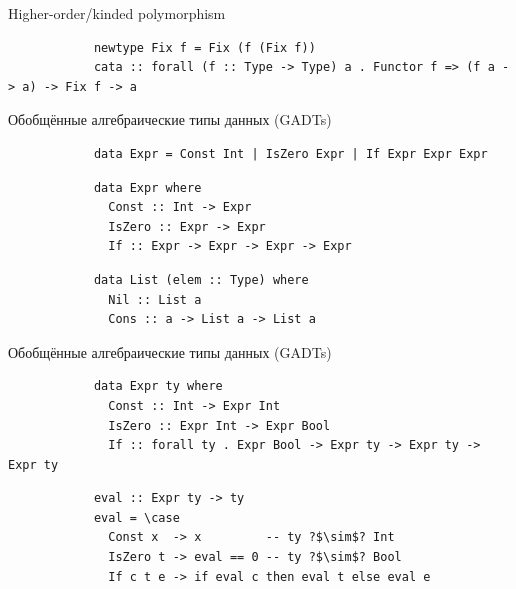     \begin{frame}[fragile]{Higher-order/kinded polymorphism}
        \pause
        \begin{verbatim}
            newtype Fix f = Fix (f (Fix f))
            cata :: forall (f :: Type -> Type) a . Functor f => (f a -> a) -> Fix f -> a
        \end{verbatim}
    \end{frame}

    \begin{frame}[fragile]{Обобщённые алгебраические типы данных (GADTs)}
        \pause
        \begin{verbatim}
            data Expr = Const Int | IsZero Expr | If Expr Expr Expr
        \end{verbatim}

        \pause\hspace{2em}
        \begin{verbatim}
            data Expr where
              Const :: Int -> Expr
              IsZero :: Expr -> Expr
              If :: Expr -> Expr -> Expr -> Expr
        \end{verbatim}

        \pause\hspace{2em}
        \begin{verbatim}
            data List (elem :: Type) where
              Nil :: List a
              Cons :: a -> List a -> List a
        \end{verbatim}
    \end{frame}

    \begin{frame}[fragile]{Обобщённые алгебраические типы данных (GADTs)}
        \pause
        \begin{verbatim}
            data Expr ty where
              Const :: Int -> Expr Int
              IsZero :: Expr Int -> Expr Bool
              If :: forall ty . Expr Bool -> Expr ty -> Expr ty -> Expr ty
        \end{verbatim}

        \pause\hspace{2em}
        \begin{verbatim}
            eval :: Expr ty -> ty
            eval = \case
              Const x  -> x         -- ty ?$\sim$? Int
              IsZero t -> eval == 0 -- ty ?$\sim$? Bool
              If c t e -> if eval c then eval t else eval e
        \end{verbatim}
    \end{frame}

